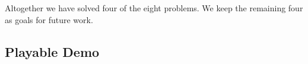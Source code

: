 \documentclass[english,submission]{programming}
\theoremstyle{definition}
\begin{document}
Altogether we have solved four of the eight problems. We keep the remaining four as goals for future work.


\subsection{Playable Demo}\label{demo}






\end{document}
